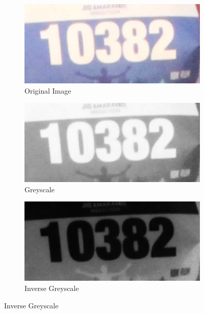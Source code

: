 \begin{figure}[h]
  \centering
  \begin{subfigure}[b]{0.23\textwidth}
    \includegraphics[width=\textwidth]{images/processing/ocr/10382_org}
    \caption{Original Image}
  \end{subfigure}
  \hspace{\fill}
  \begin{subfigure}[b]{0.23\textwidth}
    \includegraphics[width=\textwidth]{images/processing/ocr/10382_bw}
    \caption{Greyscale}
  \end{subfigure}
  \hspace{\fill}
  \begin{subfigure}[b]{0.23\textwidth}
    \includegraphics[width=\textwidth]{images/processing/ocr/10382_bw_inv}
    \caption{Inverse Greyscale}

\end{subfigure}
\end{figure}
